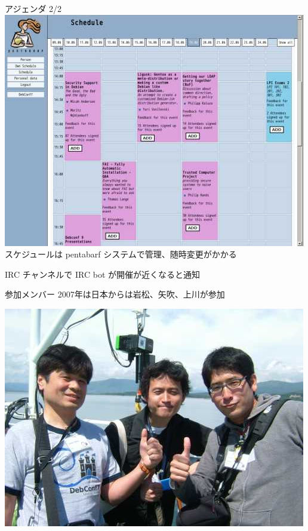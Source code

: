 \documentclass[cjk,dvipdfmx,12pt]{beamer}
\begin{document}
\begin{frame}{アジェンダ 2/2}
  \includegraphics[height=0.6\vsize]{image200707/penta.png}\\
 スケジュールは pentabarf システムで管理、随時変更がかかる

 IRC チャンネルで IRC bot が開催が近くなると通知
\end{frame}

\begin{frame}{参加メンバー}
 2007年は日本からは岩松、矢吹、上川が参加

  \includegraphics[width=1\hsize]{image200707/members.jpg}
\end{frame}
\end{document}
